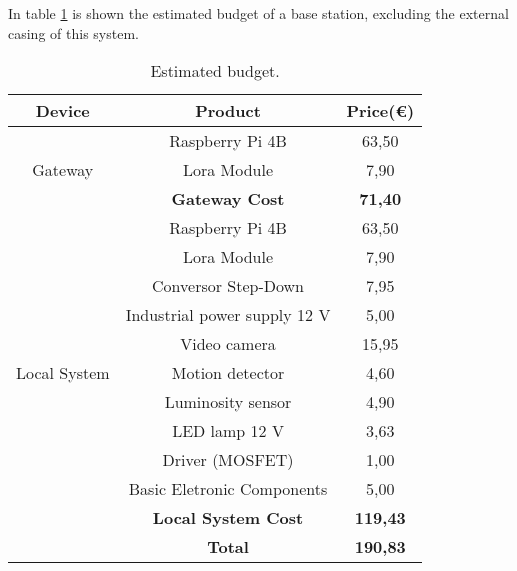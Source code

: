 In table \ref{table:data} is shown the estimated budget of a base station, excluding the external casing of this system.

\begin{table}[ht]
	\centering
	
	\begin{tabular}{||c | c | c||} 
		\hline
		\textbf{Device} & \textbf{Product} & \textbf{Price(€)}\\
		\hline\hline
		
		\multirow{3}{4em}{Gateway} & Raspberry Pi 4B & 63,50				\\
								   & Lora Module & 7,90 					\\
								   & \textbf{Gateway Cost} & \textbf{71,40}	\\
		\hline
		
		\multirow{11}{4em}{Local System} & Raspberry Pi 4B & 63,50					\\
								         & Lora Module & 7,90 						\\
								         & Conversor Step-Down & 7,95				\\
								         & Industrial power supply 12 V & 5,00		\\
								         & Video camera & 15,95						\\
								         & Motion detector & 4,60					\\
								         & Luminosity sensor & 4,90					\\
								         & LED lamp 12 V & 3,63						\\
								         & Driver (MOSFET) & 1,00					\\
								         & Basic Eletronic Components & 5,00		\\
								         & \textbf{Local System Cost} & \textbf{119,43}\\
		\hline\hline
		 & \textbf{Total} & \textbf{190,83}\\\hline
	\end{tabular}
	\caption{Estimated budget.}
	\label{table:data}
\end{table}